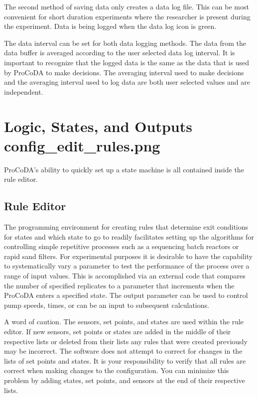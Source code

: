 \documentclass[letterpaper,10pt,english]{sphinxmanual}
\begin{document}
The second method of saving data only creates a data log file. This can be most convenient for short duration experiments where the researcher is present during the experiment. Data is being logged when the data log icon is green. 

The data interval can be set for both data logging methods. The data from the data buffer is averaged according to the user selected data log interval. It is important to recognize that the logged data is  the same as the data that is used by ProCoDA to make decisions. The averaging interval used to make decisions and the averaging interval used to log data are both user selected values and are independent.


\section[Logic, States, and Outputs]{Logic, States, and Outputs \lowercase{\sphinxincludegraphics}{{config_edit_rules}.png}}
\label{\detokenize{ProCoDA/ProCoDA:logic-states-and-outputs-config-edit-rules}}\label{\detokenize{ProCoDA/ProCoDA:heading-procoda-logic}}
ProCoDA’s ability to quickly set up a state machine is all contained inside the rule editor.


\subsection{Rule Editor}
\label{\detokenize{ProCoDA/ProCoDA:rule-editor}}\label{\detokenize{ProCoDA/ProCoDA:heading-procoda-rule-editor}}
The programming environment for creating rules that determine exit conditions for states and which state to go to readily facilitates setting up the algorithms for controlling simple repetitive processes such as a sequencing batch reactors or rapid sand filters. For experimental purposes it is desirable to have the capability to systematically vary a parameter to test the performance of the process over a range of input values. This is accomplished via an external code that compares the number of specified replicates to a parameter that increments when the ProCoDA enters a specified state. The output parameter can be used to control pump speeds, times, or can be an input to subsequent calculations.

A word of caution. The sensors, set points, and states are used within the rule editor. If new sensors, set points or states are added in the middle of their respective lists or deleted from their lists any rules that were created previously may be incorrect. The software does not attempt to correct for changes in the lists of set points and states. It is your responsibility to verify that all rules are correct when making changes to the configuration. You can minimize this problem by adding states, set points, and sensors at the end of their respective lists.
\end{document}
